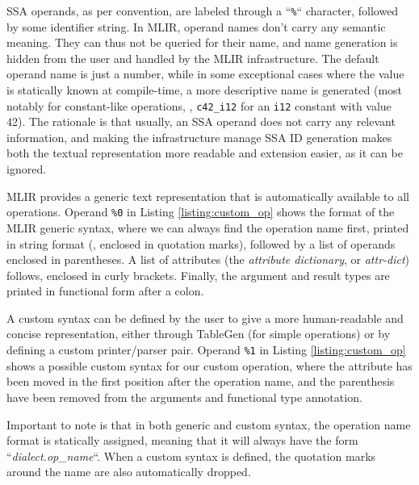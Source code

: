 SSA operands, as per convention, are labeled through a “\texttt{\%}“ character, followed by some identifier string. In MLIR, operand names don’t carry any semantic meaning. They can thus not be queried for their name, and name generation is hidden from the user and handled by the MLIR infrastructure. The default operand name is just a number, while in some exceptional cases where the value is statically known at compile-time, a more descriptive name is generated (most notably for constant-like operations, \eg, \texttt{c42\_i12} for an \texttt{i12} constant with value 42). The rationale is that usually, an SSA operand does not carry any relevant information, and making the infrastructure manage SSA ID generation makes both the textual representation more readable and extension easier, as it can be ignored.

MLIR provides a generic text representation that is automatically available to all operations. Operand \texttt{\%0} in Listing \ref{listing:custom_op} shows the format of the MLIR generic syntax, where we can always find the operation name first, printed in string format (\ie, enclosed in quotation marks), followed by a list of operands enclosed in parentheses. A list of attributes (the \textit{attribute dictionary}, or \textit{attr-dict}) follows, enclosed in curly brackets. Finally, the argument and result types are printed in functional form after a colon.

A custom syntax can be defined by the user to give a more human-readable and concise representation, either through TableGen (for simple operations) or by defining a custom printer/parser pair. Operand \texttt{\%1} in Listing \ref{listing:custom_op} shows a possible custom syntax for our custom operation, where the attribute has been moved in the first position after the operation name, and the parenthesis have been removed from the arguments and functional type annotation.

Important to note is that in both generic and custom syntax, the operation name format is statically assigned, meaning that it will always have the form “\textit{dialect.op\_name}“. When a custom syntax is defined, the quotation marks around the name are also automatically dropped.



